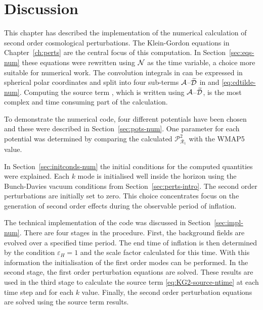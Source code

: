 % 
% 
% 

\section{Discussion}
\label{sec:disc-numerical}
This chapter has described the implementation of the numerical calculation of second
order cosmological perturbations.
The Klein-Gordon equations in Chapter~\ref{ch:perts} are the central focus of this
computation. In Section~\ref{sec:eqs-num} these equations were rewritten using $\mathcal{N}$
as the time variable, a choice more suitable for numerical work. The convolution
integrals in  can be expressed in spherical polar
coordinates and split into four sub-terms $\mathcal{A}$--$\widetilde{\mathcal{D}}$ in  and
\eqref{eq:cdtilde-num}. Computing the source term
, which is written using $\mathcal{A}$--$\widetilde{\mathcal{D}}$, is the most complex
and
time consuming part of the calculation.

To demonstrate the numerical code, four different potentials have been chosen and
these were described in Section~\ref{sec:pots-num}. One parameter for each
potential was determined by comparing the calculated $\mathcal{P}^2_{\mathcal{R}_1}$
with the WMAP5 value.

In Section~\ref{sec:initconds-num} the initial conditions for the computed
quantities were explained. Each $k$ mode is initialised well inside the horizon
using the Bunch-Davies vacuum conditions from Section~\ref{sec:perts-intro}. The
second order perturbations are initially set to zero. This choice
concentrates focus
on the generation of second order effects during the observable period of
inflation.


The technical implementation of the code was discussed in
Section~\ref{sec:impl-num}. There are four stages in the procedure. First, the
background fields are evolved over a specified time period. The end time of
inflation is then determined by the condition $\varepsilon_H=1$ and the scale factor
calculated for this time. With this
information the initialisation of the first order modes can be performed. In the
second stage, the first order perturbation equations are solved. These results are
used in the third stage to calculate the source term \eqref{eq:KG2-source-ntime} at
each
time step and for each $k$ value. Finally, the second order perturbation equations
are solved using
the source term results.

